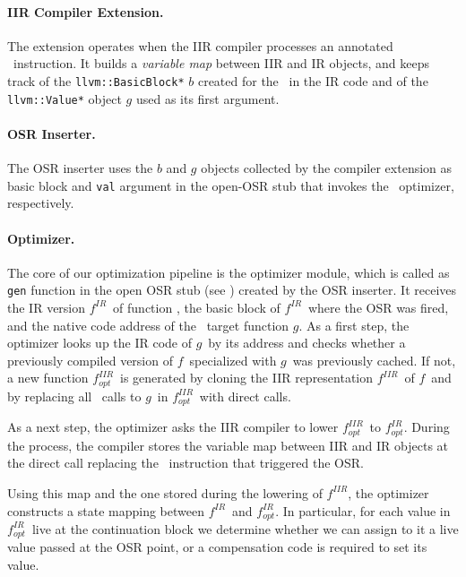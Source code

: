 \paragraph*{IIR Compiler Extension.} The extension operates when the IIR compiler processes an annotated \feval\ instruction. It builds a {\em variable map} between IIR and IR objects, and keeps track of the {\tt llvm::BasicBlock*} $b$ created for the \feval\ in the IR code and of the {\tt llvm::Value*} object $g$ used as its first argument. 

\paragraph*{OSR Inserter.} The OSR inserter uses the $b$ and $g$ objects collected by the compiler extension as basic block and {\tt val} argument in the open-OSR stub that invokes the \feval\ optimizer, respectively.

\newcommand{\fBase}{$f$}
\newcommand{\fOpt}{$f_{opt}$}
\newcommand{\fIIR}{$f^{IIR}$}
\newcommand{\fIR}{$f^{IR}$}
\newcommand{\fOptIIR}{$f^{IIR}_{opt}$}
\newcommand{\fOptIR}{$f^{IR}_{opt}$}
\newcommand{\gTarget}{$g$}

\paragraph*{Optimizer.} The core of our optimization pipeline is the optimizer module, which is called as {\tt gen} function in the open OSR stub (see \missing) created by the OSR inserter. It receives the IR version \fIR\ of function \fbase, the basic block of \fIR\ where the OSR was fired, and the native code address of the \feval\ target function \gTarget. As a first step, the optimizer looks up the IR code of \gTarget\ by its address and checks whether a previously compiled version of \fBase\ specialized with \gTarget\ was previously cached. If not, a new function \fOptIIR\ is generated by cloning the IIR representation \fIIR\ of \fBase\ and by replacing all \feval\ calls to \gTarget\ in \fOptIIR\ with direct calls.

As a next step, the optimizer asks the IIR compiler to lower \fOptIIR\ to \fOptIR. During the process, the compiler stores the variable map between IIR and IR objects at the direct call replacing the \feval\ instruction that triggered the OSR.

Using this map and the one stored during the lowering of \fIIR, the optimizer constructs a state mapping between \fIR\ and \fOptIR. In particular, for each value in \fOptIR\ live at the continuation block we determine whether we can assign to it a live value passed at the OSR point, or a compensation code is required to set its value.

